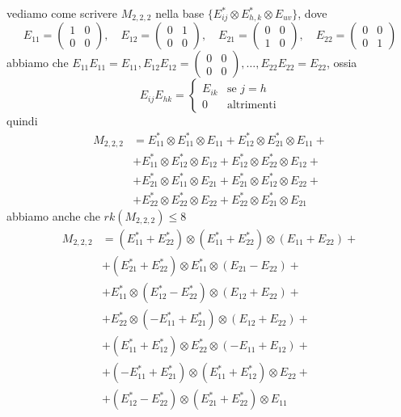 \documentclass[../main.tex]{subfiles}
\begin{document}
vediamo come scrivere $M_{2,2,2}$ nella base $\{E_{ij}^* \otimes E_{h,k}^* \otimes E_{uv}\}$, dove
\begin{equation*}
    E_{11} = \begin{pmatrix}
        1 & 0 \\
        0 & 0
    \end{pmatrix}, \quad
    E_{12} = \begin{pmatrix}
        0 & 1 \\
        0 & 0
    \end{pmatrix}, \quad
    E_{21} = \begin{pmatrix}
        0 & 0 \\
        1 & 0
    \end{pmatrix}, \quad
    E_{22} = \begin{pmatrix}
        0 & 0 \\
        0 & 1
    \end{pmatrix}
\end{equation*}
abbiamo che $E_{11}E_{11} = E_{11}, E_{12}E_{12} = \begin{pmatrix}
        0 & 0 \\
        0 & 0
    \end{pmatrix}, \ldots, E_{22}E_{22} = E_{22}$, ossia
\begin{equation*}
    E_{ij} E_{hk} = \begin{cases}
        E_{ik} & \text{se } j = h  \\
        0      & \text{altrimenti}
    \end{cases}
\end{equation*}
quindi
\begin{align*}
    M_{2,2,2} & = E_{11}^* \otimes E_{11}^* \otimes E_{11} + E_{12}^* \otimes E_{21}^* \otimes E_{11} + \\
              & + E_{11}^* \otimes E_{12}^* \otimes E_{12} + E_{12}^* \otimes E_{22}^* \otimes E_{12} + \\
              & + E_{21}^* \otimes E_{11}^* \otimes E_{21} + E_{21}^* \otimes E_{12}^* \otimes E_{22} + \\
              & + E_{22}^* \otimes E_{22}^* \otimes E_{22} + E_{22}^* \otimes E_{21}^* \otimes E_{21}
\end{align*}
abbiamo anche che $rk(M_{2,2,2}) \leq 8$
\begin{align*}
    M_{2,2,2} & = (E_{11}^* + E_{22}^*) \otimes (E_{11}^* + E_{22}^*) \otimes (E_{11} + E_{22}) + \\
              & + (E_{21}^* + E_{22}^*) \otimes E_{11}^* \otimes (E_{21} - E_{22}) +              \\
              & + E_{11}^* \otimes (E_{12}^* - E_{22}^*) \otimes (E_{12} + E_{22}) +              \\
              & + E_{22}^* \otimes (-E_{11}^* + E_{21}^*) \otimes (E_{12} + E_{22}) +             \\
              & + (E_{11}^* + E_{12}^*) \otimes E_{22}^* \otimes (-E_{11} + E_{12}) +             \\
              & + (-E_{11}^* + E_{21}^*) \otimes (E_{11}^* + E_{12}^*) \otimes E_{22} +           \\
              & + (E_{12}^* - E_{22}^*) \otimes (E_{21}^* + E_{22}^*) \otimes E_{11}
\end{align*}
\end{document}
